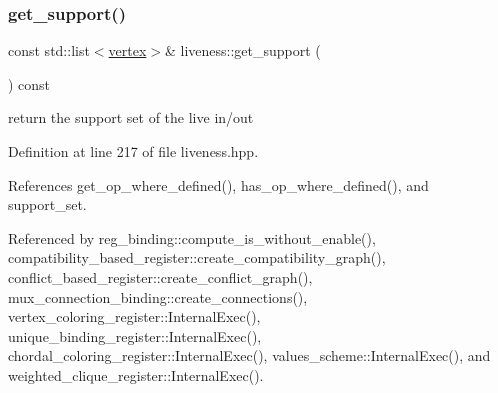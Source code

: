 \subsubsection{\texorpdfstring{get\+\_\+support()}{get\_support()}}
{\footnotesize\ttfamily const std\+::list$<$\hyperlink{graph_8hpp_abefdcf0544e601805af44eca032cca14}{vertex}$>$\& liveness\+::get\+\_\+support (\begin{DoxyParamCaption}{ }\end{DoxyParamCaption}) const\hspace{0.3cm}{\ttfamily [inline]}}



return the support set of the live in/out 



Definition at line 217 of file liveness.\+hpp.



References get\+\_\+op\+\_\+where\+\_\+defined(), has\+\_\+op\+\_\+where\+\_\+defined(), and support\+\_\+set.



Referenced by reg\+\_\+binding\+::compute\+\_\+is\+\_\+without\+\_\+enable(), compatibility\+\_\+based\+\_\+register\+::create\+\_\+compatibility\+\_\+graph(), conflict\+\_\+based\+\_\+register\+::create\+\_\+conflict\+\_\+graph(), mux\+\_\+connection\+\_\+binding\+::create\+\_\+connections(), vertex\+\_\+coloring\+\_\+register\+::\+Internal\+Exec(), unique\+\_\+binding\+\_\+register\+::\+Internal\+Exec(), chordal\+\_\+coloring\+\_\+register\+::\+Internal\+Exec(), values\+\_\+scheme\+::\+Internal\+Exec(), and weighted\+\_\+clique\+\_\+register\+::\+Internal\+Exec().

